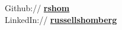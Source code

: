 Github:// \href{https://github.com/rshom}{\bf rshom} \\
LinkedIn://  \href{https://www.linkedin.com/in/russellshomberg}{\bf russellshomberg} \\
